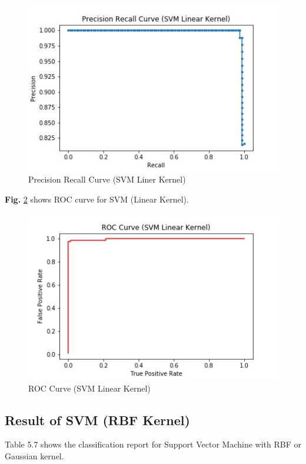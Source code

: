 \documentclass[12pt,a4paper]{report}
\begin{document}
\begin{figure}[h!]
    \centering
    \includegraphics[scale=0.58]{Figures/PRSL.jpg}
    \caption{Precision Recall Curve (SVM Liner Kernel)}
    \label{fig:prsl}
\end{figure}

\noindent
\textbf{Fig.} \ref{fig:rocsl} shows ROC curve for SVM (Linear Kernel).

\begin{figure}[h!]
    \centering
    \includegraphics[scale=0.58]{Figures/ROCSL.jpg}
    \caption{ROC Curve (SVM Linear Kernel)}
    \label{fig:rocsl}
\end{figure}


\subsection{Result of SVM (RBF Kernel)}
Table 5.7 shows the classification report for Support Vector Machine with RBF or Gaussian kernel.
\end{document}
